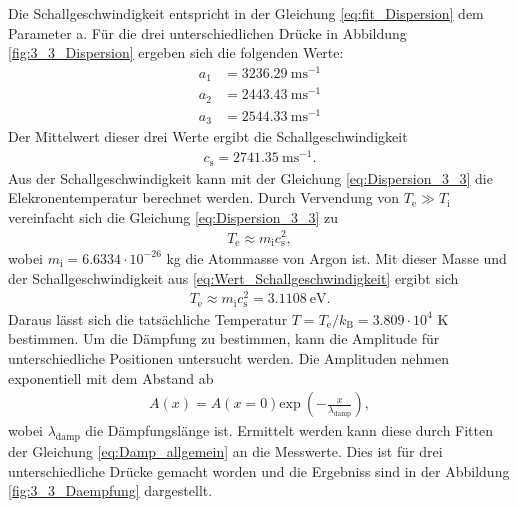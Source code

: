Die Schallgeschwindigkeit entspricht in der Gleichung \eqref{eq:fit_Dispersion} dem Parameter a. Für die drei unterschiedlichen Drücke in Abbildung \ref{fig:3_3_Dispersion} ergeben sich die folgenden Werte:
\begin{align}
  a_1 & = 3236.29\  \mathrm{m s}^{-1} \\
  a_2 & = 2443.43\  \mathrm{m s}^{-1} \\
  a_3 & = 2544.33\  \mathrm{m s}^{-1}
\end{align}
Der Mittelwert dieser drei Werte ergibt die Schallgeschwindigkeit
\begin{align}
  c_{\mathrm{s}}= 2741.35\  \mathrm{m s}^{-1}.
  \label{eq:Wert_Schallgeschwindigkeit}
\end{align}
Aus der Schallgeschwindigkeit kann mit der Gleichung \eqref{eq:Dispersion_3_3} die Elekronentemperatur berechnet werden. Durch Vervendung von  $T_{\mathrm{e}} \gg T_{\mathrm{i}}$ vereinfacht sich die Gleichung  \eqref{eq:Dispersion_3_3} zu
\begin{align}
  T_{\mathrm{e}} \approx m_{\mathrm{i}} c_{\mathrm{s}}^2,
  \end{align}
wobei $ m_{\mathrm{i}}=6.6334 \cdot 10^{-26}$ kg \cite{wiki:Argon}  die Atommasse von Argon  ist. Mit dieser Masse und der Schallgeschwindigkeit aus \eqref{eq:Wert_Schallgeschwindigkeit} ergibt sich
\begin{align}
   T_{\mathrm{e}} \approx m_{\mathrm{i}} c_{\mathrm{s}}^2= 3.1108\ \mathrm{eV}.
  \end{align} 
Daraus lässt sich die tatsächliche Temperatur $T=T_{\mathrm{e}}/k_{\mathrm{B}}=3.809 \cdot 10^4$ K bestimmen.  Um die Dämpfung zu bestimmen, kann die Amplitude für unterschiedliche Positionen untersucht werden. Die Amplituden nehmen exponentiell mit dem Abstand ab
\begin{align}
  A(x) = A(x=0) \mathrm{exp}\ \left(- \frac{x}{\lambda_{\mathrm{damp}}}  \right),
  \label{eq:Damp_allgemein}
\end{align}
wobei $\lambda_{\mathrm{damp}}$ die Dämpfungslänge ist. Ermittelt werden kann diese durch Fitten der Gleichung \eqref{eq:Damp_allgemein} an die Messwerte. Dies ist für drei unterschiedliche Drücke gemacht worden und die Ergebniss sind in der Abbildung \ref {fig:3_3_Daempfung} dargestellt. 
